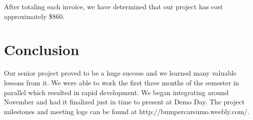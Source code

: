 \documentclass[11pt]{ieeeconf}
\begin{document}
After totaling each invoice, we have determined that our project has cost approximately \$860.

\section{Conclusion}

Our senior project proved to be a huge success and we learned many valuable lessons from it. We were able to work the first three months of the semester in parallel which resulted in rapid development. We began integrating around November and had it finalized just in time to present at Demo Day. The project milestones and meeting logs can be found at http://bumpercarsumo.weebly.com/.



\end{document}
